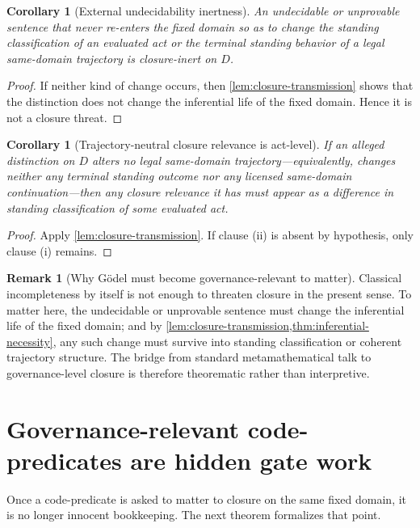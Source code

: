\documentclass[11pt]{article}
\theoremstyle{plain}
\newtheorem{corollary}[theorem]{Corollary}
\theoremstyle{definition}
\newtheorem{remark}[theorem]{Remark}
\newcommand{\domain}{D}
\begin{document}
\begin{corollary}[External undecidability inertness]
\label{cor:external-inert}
An undecidable or unprovable sentence that never re-enters the fixed domain so as to change the standing classification of an evaluated act or the terminal standing behavior of a legal same-domain trajectory is closure-inert on $\domain$.
\end{corollary}

\begin{proof}
If neither kind of change occurs, then \cref{lem:closure-transmission} shows that the distinction does not change the inferential life of the fixed domain. Hence it is not a closure threat.
\end{proof}

\begin{corollary}[Trajectory-neutral closure relevance is act-level]
\label{cor:trajectory-neutral}
If an alleged distinction on $\domain$ alters no legal same-domain trajectory---equivalently, changes neither any terminal standing outcome nor any licensed same-domain continuation---then any closure relevance it has must appear as a difference in standing classification of some evaluated act.
\end{corollary}

\begin{proof}
Apply \cref{lem:closure-transmission}. If clause (ii) is absent by hypothesis, only clause (i) remains.
\end{proof}

\begin{remark}[Why G\"odel must become governance-relevant to matter]
Classical incompleteness by itself is not enough to threaten closure in the present sense. To matter here, the undecidable or unprovable sentence must change the inferential life of the fixed domain; and by \cref{lem:closure-transmission,thm:inferential-necessity}, any such change must survive into standing classification or coherent trajectory structure. The bridge from standard metamathematical talk to governance-level closure is therefore theorematic rather than interpretive.
\end{remark}

\section{Governance-relevant code-predicates are hidden gate work}
\label{sec:predicates}

Once a code-predicate is asked to matter to closure on the same fixed domain, it is no longer innocent bookkeeping. The next theorem formalizes that point.
\end{document}
